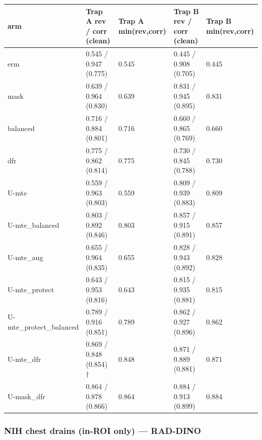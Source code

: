 {{ %
\begin{longtable}[]{@{}lllll@{}}
\toprule\noalign{}
arm & Trap A rev / corr (clean) & Trap A min(rev,corr) & Trap B rev / corr (clean) & Trap B min(rev,corr) \\
\midrule\noalign{}
\endhead
\bottomrule\noalign{}
\endlastfoot
erm & 0.545 / 0.947 (0.775) & 0.545 & 0.445 / 0.908 (0.705) & 0.445 \\
mask & 0.639 / 0.964 (0.830) & 0.639 & 0.831 / 0.945 (0.895) & 0.831 \\
balanced & 0.716 / 0.884 (0.801) & 0.716 & 0.660 / 0.865 (0.769) & 0.660 \\
dfr & 0.775 / 0.862 (0.814) & 0.775 & 0.730 / 0.845 (0.788) & 0.730 \\
U-mte & 0.559 / 0.963 (0.803) & 0.559 & 0.809 / 0.939 (0.883) & 0.809 \\
U-mte\_balanced & 0.803 / 0.892 (0.846) & 0.803 & 0.857 / 0.915 (0.891) & 0.857 \\
U-mte\_aug & 0.655 / 0.964 (0.835) & 0.655 & 0.828 / 0.943 (0.892) & 0.828 \\
U-mte\_protect & 0.643 / 0.953 (0.816) & 0.643 & 0.815 / 0.935 (0.881) & 0.815 \\
U-mte\_protect\_balanced & 0.789 / 0.916 (0.851) & 0.789 & 0.862 / 0.927 (0.896) & 0.862 \\
U-mte\_dfr & 0.869 / 0.848 (0.854) † & 0.848 & 0.871 / 0.889 (0.881) & 0.871 \\
U-mask\_dfr & 0.864 / 0.878 (0.866) & 0.864 & 0.884 / 0.913 (0.899) & 0.884 \\
\end{longtable}
}

\subsubsection{NIH chest drains (in-ROI only) --- RAD-DINO}\label{nih-chest-drains-in-roi-only--rad-dino}

}
